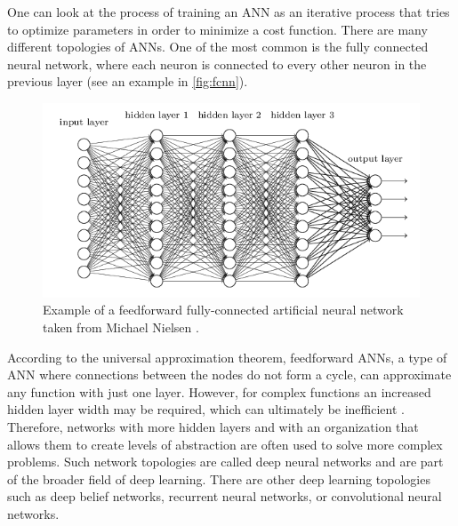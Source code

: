     One can look at the process of training an \ac{ANN} as an iterative process that tries to optimize parameters in order to minimize a cost function. There are many different topologies of \ac{ANN}s. One of the most common is the fully connected neural network, where each neuron is connected to every other neuron in the previous layer (see an example in \autoref{fig:fcnn}). \par
    
    \begin{figure}[ht]
      \centering
        \includegraphics[width=0.8\linewidth]{figs/Deep_Learning.png}
      \caption{Example of a feedforward fully-connected artificial neural network taken from Michael Nielsen \cite{Nielsen2017a}.}
      \label{fig:fcnn}
    \end{figure}

    According to the universal approximation theorem, feedforward \ac{ANN}s, a type of \ac{ANN} where connections between the nodes do not form a cycle, can approximate any function with just one layer. However, for complex functions an increased hidden layer width may be required, which can ultimately be inefficient \cite{Cybenko1989}. Therefore, networks with more hidden layers and with an organization that allows them to create levels of abstraction are often used to solve more complex problems. Such network topologies are called deep neural networks and are part of the broader field of deep learning. There are other deep learning topologies such as deep belief networks, recurrent neural networks, or convolutional neural networks. \par
    
